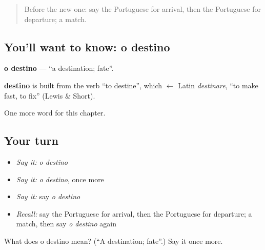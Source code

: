 \label{lesson:PT-C166-destino}



\begin{quote}
Before the new one: say the Portuguese for arrival, then the Portuguese for departure; a match.
\end{quote}

\subsection*{You'll want to know: o destino}
\textbf{o destino} — \textquotedblleft{}a destination; fate\textquotedblright{}.

\begin{cousinweb}
\textbf{destino} is built from the verb \textquotedblleft{}to destine\textquotedblright{}, which $\leftarrow$ Latin \emph{destinare}, \textquotedblleft{}to make fast, to fix\textquotedblright{} (Lewis \& Short).
\end{cousinweb}

\begin{grammarlens}[title={What you've built}]
One more word for this chapter.
\end{grammarlens}

\subsection*{Your turn}
\begin{itemize}
\raggedright
  \item \emph{Say it:} \emph{o destino}
  \item \emph{Say it:} \emph{o destino}, once more
  \item \emph{Say it:} say \emph{o destino}
  \item \emph{Recall:} say the Portuguese for arrival, then the Portuguese for departure; a match, then say \emph{o destino} again
\end{itemize}

\begin{tcolorbox}[breakable,colback=teal!4,colframe=teal!35!black,title={Before you move on}]
What does o destino mean? (\textquotedblleft{}A destination; fate\textquotedblright{}.) Say it once more.
\end{tcolorbox}
